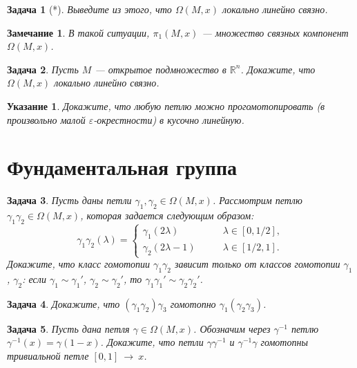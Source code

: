 \documentclass[12pt]{book}
\newcommand{\subs}{\section}
\newcommand{\arrow}{{\:\longrightarrow\:}}
\renewcommand{\epsilon}{\varepsilon}
\def\R{{\mathbb R}}
\theoremstyle{upshape}
\newtheorem{zadacha}{Задача}[chapter]
\theoremstyle{generic}
\theoremstyle{upshapenonumber}
\newtheorem{ukazanie}{Указание}[section]
\newtheorem{zamechanie}{Замечание}[chapter]
\newcommand{\следствие}{%
     \refstepcounter{teorema}
     {\noindent\bf Следствие \thechapter.\arabic{teorema}:\ }}
\newcommand{\пример}{%
     \refstepcounter{teorema}
     {\noindent\bf Пример \thechapter.\arabic{teorema}:\ }}
\newcommand{\лемма}{%
     \refstepcounter{teorema}
     {\noindent\bf Лемма \thechapter.\arabic{teorema}:\ }}
\newcommand{\теорема}{%
     \refstepcounter{teorema}
     {\noindent\bf Теорема \thechapter.\arabic{teorema}:\ }}
\newcommand{\утверждение}{%
     \refstepcounter{teorema}
     {\noindent\bf Утверждение \thechapter.\arabic{teorema}:\ }}
\begin{document}
{\begin{zadacha}[*]
Выведите из этого, что $\Omega(M,x)$
локально линейно связно.
\end{zadacha}

\begin{zamechanie}
В такой ситуации, $\pi_1(M, x)$ --- множество
связных компонент $\Omega(M, x)$.
\end{zamechanie}

\begin{zadacha} 
Пусть $M$ --- открытое подмножество в $\R^n$.
Докажите, что $\Omega(M, x)$ локально линейно связно.
\end{zadacha}

\begin{ukazanie}
Докажите, что любую петлю можно прогомотопировать (в 
произвольно малой $\epsilon$-окрестности) в кусочно
линейную.
\end{ukazanie}



\subs{Фундаментальная группа}

\begin{zadacha}\label{_proizvede_Zadacha_}
Пусть даны петли $\gamma_1, \gamma_2 \in \Omega(M, x)$.
Рассмотрим петлю $\gamma_1 \gamma_2\in \Omega(M, x)$, 
которая задается следующим образом:
\[
\gamma_1 \gamma_2(\lambda) = 
\begin{cases}
\gamma_1(2\lambda) &\qquad \lambda\in [0, 1/2],\\
\gamma_2(2\lambda-1) &\qquad \lambda\in [1/2,1].
\end{cases}
\]
Докажите, что класс гомотопии $\gamma_1\gamma_2$ зависит
только от классов гомотопии $\gamma_1$, $\gamma_2$: если 
$\gamma_1\sim\gamma_1'$, $\gamma_2\sim\gamma_2'$,
то $\gamma_1\gamma_1'\sim \gamma_2\gamma_2'$.
\end{zadacha}

\begin{zadacha}
Докажите, что $(\gamma_1\gamma_2)\gamma_3$ гомотопно
$\gamma_1 (\gamma_2\gamma_3)$.
\end{zadacha}

\begin{zadacha} 
Пусть дана петля $\gamma \in \Omega(M, x)$.
Обозначим через $\gamma^{-1}$ петлю $\gamma^{-1}(x) = \gamma(1-x)$.
Докажите, что петли $\gamma \gamma^{-1}$ и $\gamma^{-1} \gamma$
гомотопны тривиальной петле $[0,1]\arrow x$.
\end{zadacha}

}
\end{document}
